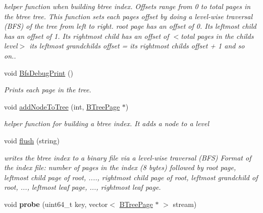 \begin{DoxyCompactItemize}
\begin{DoxyCompactList}\small\item\em helper function when building btree index. Offsets range from 0 to total pages in the btree tree. This function sets each page\textquotesingle{}s offset by doing a level-\/wise traversal (B\+F\+S) of the tree from left to right. root page has an offset of 0. Its leftmost child has an offset of 1. Its rightmost child has an offset of $<$total pages in the child\textquotesingle{}s level$>$ its leftmost grandchild\textquotesingle{}s offset = its rightmost child\textquotesingle{}s offset + 1 and so on.. \end{DoxyCompactList}\item 
\hypertarget{class_b_tree_index_af931d39bed7e041211aafd30c6972152}{}void \hyperlink{class_b_tree_index_af931d39bed7e041211aafd30c6972152}{Bfs\+Debug\+Print} ()\label{class_b_tree_index_af931d39bed7e041211aafd30c6972152}

\begin{DoxyCompactList}\small\item\em Prints each page in the tree. \end{DoxyCompactList}\item 
\hypertarget{class_b_tree_index_a37e5ad19a5ccc848bf9a80480e1a0ec3}{}void \hyperlink{class_b_tree_index_a37e5ad19a5ccc848bf9a80480e1a0ec3}{add\+Node\+To\+Tree} (int, \hyperlink{class_b_tree_page}{B\+Tree\+Page} $\ast$)\label{class_b_tree_index_a37e5ad19a5ccc848bf9a80480e1a0ec3}

\begin{DoxyCompactList}\small\item\em helper function for building a btree index. It adds a node to a level \end{DoxyCompactList}\item 
void \hyperlink{class_b_tree_index_a5f08960f28fbaee925bd76a225110f56}{flush} (string)
\begin{DoxyCompactList}\small\item\em writes the btree index to a binary file via a level-\/wise traversal (B\+F\+S) Format of the index file\+: number of pages in the index (8 bytes) followed by root page, leftmost child page of root, ...., rightmost child page of root, leftmost grandchild of root, ..., leftmost leaf page, ..., rightmost leaf page. \end{DoxyCompactList}\item 
\hypertarget{class_b_tree_index_a3b32e1e49d409365bffaf2f111068f23}{}void {\bfseries probe} (uint64\+\_\+t key, vector$<$ \hyperlink{class_b_tree_page}{B\+Tree\+Page} $\ast$ $>$ stream)\label{class_b_tree_index_a3b32e1e49d409365bffaf2f111068f23}


\end{DoxyCompactItemize}

